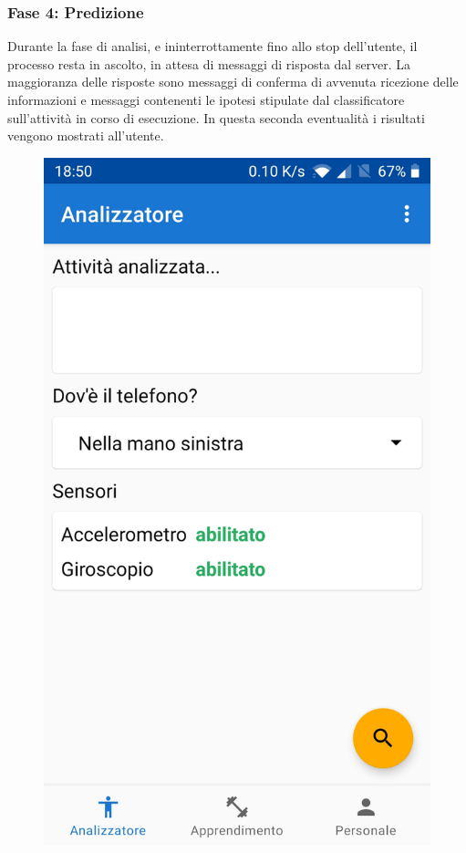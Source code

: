 \subsubsection{Fase 4: Predizione}
Durante la fase di analisi, e ininterrottamente fino allo stop dell'utente, il processo resta in ascolto, in attesa di 
messaggi di risposta dal server.
La maggioranza delle risposte sono messaggi di conferma di avvenuta ricezione delle informazioni e messaggi contenenti 
le ipotesi stipulate dal classificatore sull'attività in corso di esecuzione.
In questa seconda eventualità i risultati vengono mostrati all'utente.
\begin{figure}[H]
    \centering
    \includegraphics[scale = 0.1019]{assets/images/screenshots/1a_Init.jpg}

\end{figure}
